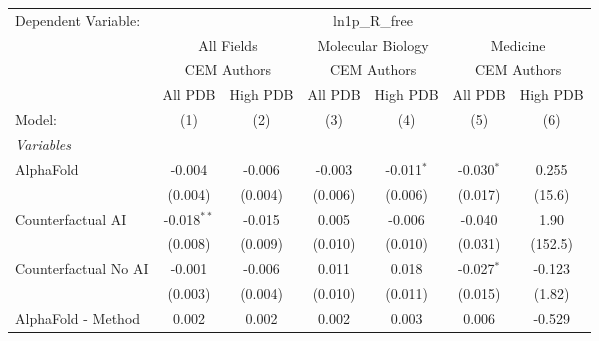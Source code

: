 \begingroup
\centering
\begin{tabular}{lcccccc}
   \tabularnewline \midrule \midrule
   Dependent Variable: & \multicolumn{6}{c}{ln1p\_R\_free}\\
 & \multicolumn{2}{c}{All Fields} & \multicolumn{2}{c}{Molecular Biology} & \multicolumn{2}{c}{Medicine} \\
\cmidrule(lr){2-3} \cmidrule(lr){4-5} \cmidrule(lr){6-7}
 & \multicolumn{2}{c}{CEM Authors} & \multicolumn{2}{c}{CEM Authors} & \multicolumn{2}{c}{CEM Authors} \\
\cmidrule(lr){2-3} \cmidrule(lr){4-5} \cmidrule(lr){6-7}
 & \multicolumn{1}{c}{All PDB} & \multicolumn{1}{c}{High PDB} & \multicolumn{1}{c}{All PDB} & \multicolumn{1}{c}{High PDB} & \multicolumn{1}{c}{All PDB} & \multicolumn{1}{c}{High PDB} \\
\cmidrule(lr){2-2} \cmidrule(lr){3-3} \cmidrule(lr){4-4} \cmidrule(lr){5-5} \cmidrule(lr){6-6} \cmidrule(lr){7-7}
   Model:                                                     & (1)           & (2)          & (3)          & (4)            & (5)           & (6)\\  
   \midrule
   \emph{Variables}\\
   AlphaFold                                                  & -0.004        & -0.006       & -0.003       & -0.011$^{*}$   & -0.030$^{*}$  & 0.255\\   
                                                              & (0.004)       & (0.004)      & (0.006)      & (0.006)        & (0.017)       & (15.6)\\   
   Counterfactual AI                                          & -0.018$^{**}$ & -0.015       & 0.005        & -0.006         & -0.040        & 1.90\\   
                                                              & (0.008)       & (0.009)      & (0.010)      & (0.010)        & (0.031)       & (152.5)\\   
   Counterfactual No AI                                       & -0.001        & -0.006       & 0.011        & 0.018          & -0.027$^{*}$  & -0.123\\   
                                                              & (0.003)       & (0.004)      & (0.010)      & (0.011)        & (0.015)       & (1.82)\\   
   AlphaFold - Method                                         & 0.002         & 0.002        & 0.002        & 0.003          & 0.006         & -0.529\\   

\end{tabular}
